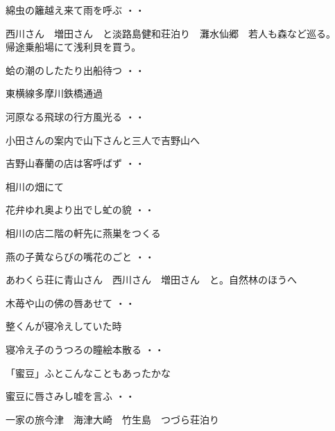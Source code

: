 \begin{shiika}綿虫の籬越え来て雨を呼ぶ
\hfill{・・}\end{shiika}
\vspace{0.6cm}
西川さん　増田さん　と淡路島健和荘泊り　灘水仙郷　若人も森など巡る。\\
帰途乗船場にて浅利貝を買う。
\begin{shiika}蛤の潮のしたたり出船待つ
\hfill{・・}\end{shiika}
\vspace{0.6cm}
東横線多摩川鉄橋通過
\begin{shiika}河原なる飛球の行方風光る
\hfill{・・}\end{shiika}
\vspace{0.6cm}
小田さんの案内で山下さんと三人で吉野山へ
\begin{shiika}吉野山春蘭の店は客呼ばず
\hfill{・・}\end{shiika}
\vspace{0.6cm}
相川の畑にて
\begin{shiika}花弁ゆれ奥より出でし虻の貌
\hfill{・・}\end{shiika}
\vspace{0.6cm}
相川の店二階の軒先に燕巣をつくる
\begin{shiika}燕の子黄ならびの嘴花のごと
\hfill{・・}\end{shiika}
\vspace{0.6cm}
あわくら荘に青山さん　西川さん　増田さん　と。自然林のほうへ
\begin{shiika}木苺や山の佛の唇あせて
\hfill{・・}\end{shiika}
\vspace{0.6cm}
整くんが寝冷えしていた時
\begin{shiika}寝冷え子のうつろの瞳絵本散る
\hfill{・・}\end{shiika}
\vspace{0.6cm}
「蜜豆」ふとこんなこともあったかな
\begin{shiika}蜜豆に唇さみし嘘を言ふ
\hfill{・・}\end{shiika}
\vspace{0.6cm}
一家の旅今津　海津大崎　竹生島　つづら荘泊り\\
